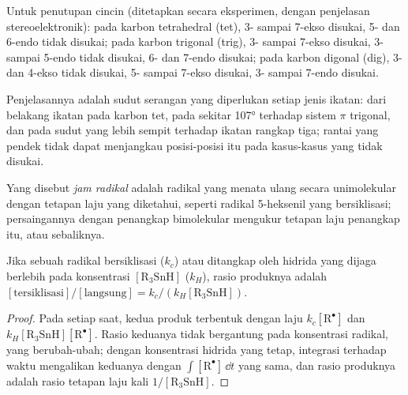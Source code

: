 \begin{proposition}\label{prop:b3:radicals-carbenes:baldwin}
Untuk penutupan cincin (ditetapkan secara eksperimen, dengan penjelasan
stereoelektronik): pada karbon tetrahedral (tet), 3- sampai 7-ekso disukai, 5- dan
6-endo tidak disukai; pada karbon trigonal (trig), 3- sampai 7-ekso disukai, 3- sampai 5-endo
tidak disukai, 6- dan 7-endo disukai; pada karbon digonal (dig), 3- dan 4-ekso
tidak disukai, 5- sampai 7-ekso disukai, 3- sampai 7-endo disukai.
\end{proposition}

Penjelasannya adalah sudut serangan yang diperlukan setiap jenis ikatan: dari belakang
ikatan pada karbon tet, pada sekitar 107° terhadap sistem $\pi$ trigonal, dan pada sudut yang lebih
sempit terhadap ikatan rangkap tiga; rantai yang pendek tidak dapat menjangkau posisi-posisi itu pada
kasus-kasus yang tidak disukai.

\begin{definition}\label{def:b3:radicals-carbenes:radical-clock}
Yang disebut \emph{jam radikal} adalah radikal yang menata ulang
secara unimolekular dengan tetapan laju yang diketahui, seperti radikal 5-heksenil yang
bersiklisasi; persaingannya dengan penangkap bimolekular mengukur tetapan laju
penangkap itu, atau sebaliknya.
\end{definition}

\begin{proposition}\label{prop:b3:radicals-carbenes:clock}
Jika sebuah radikal bersiklisasi ($k_c$) atau ditangkap oleh hidrida yang dijaga berlebih pada
konsentrasi $[\mathrm{R_3SnH}]$ ($k_H$), rasio produknya adalah
$[\text{tersiklisasi}]/[\text{langsung}] = k_c/(k_H[\mathrm{R_3SnH}])$.
\end{proposition}

\begin{proof}
Pada setiap saat, kedua produk terbentuk dengan laju $k_c[\mathrm R^\bullet]$ dan $k_H[\mathrm{R_3SnH}][\mathrm R^\bullet]$. Rasio keduanya
tidak bergantung pada konsentrasi radikal, yang berubah-ubah; dengan konsentrasi hidrida
yang tetap, integrasi terhadap waktu mengalikan keduanya dengan
$\int[\mathrm R^\bullet]\,\dd t$ yang sama, dan rasio produknya adalah rasio tetapan laju
kali $1/[\mathrm{R_3SnH}]$.
\end{proof}

